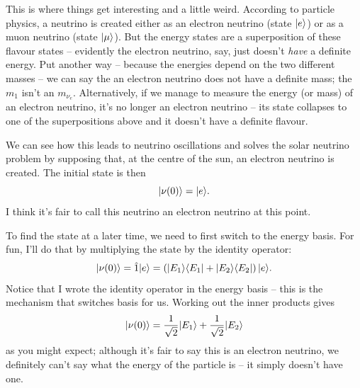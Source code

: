 This is where things get interesting and a little weird.   According to particle physics, a neutrino is created either as an electron neutrino (state $| e \rangle$) or as a muon neutrino (state $| \mu \rangle$).  But the energy states are a superposition of these flavour states -- evidently the electron neutrino, say, just doesn't \emph{have} a definite energy.  Put another way -- because the energies depend on the two different masses -- we can say the an electron neutrino does not have a definite mass; the $m_1$ isn't an $m_{\nu_e}$.  Alternatively, if we manage to measure the energy (or mass) of an electron neutrino, it's no longer an electron neutrino -- its state collapses to one of the superpositions above and it doesn't have a definite flavour.

We can see how this leads to neutrino oscillations and solves the solar neutrino problem by supposing that, at the centre of the sun, an electron neutrino is created.  The initial state is then
\begin{equation}
| \nu(0) \rangle = | e \rangle.
\end{equation}
I think it's fair to call this neutrino an electron neutrino at this point.

To find the state at a later time, we need to first switch to the energy basis.  For fun, I'll do that by multiplying the state by the identity operator:
\[
| \nu(0) \rangle = \hat{1} | e \rangle = \left( | E_1 \rangle\langle E_1 | + | E_2 \rangle \langle E_2 | \right) | e \rangle.
\]
Notice that I wrote the identity operator in the energy basis -- this is the mechanism that switches basis for us.  Working out the inner products gives
\begin{equation}
| \nu(0) \rangle =  \frac{1}{\sqrt{2}} | E_1 \rangle + \frac{1}{\sqrt{2}} | E_2 \rangle
\end{equation}
as you might expect; although it's fair to say this is an electron neutrino, we definitely can't say what the energy of the particle is -- it simply doesn't have one.

